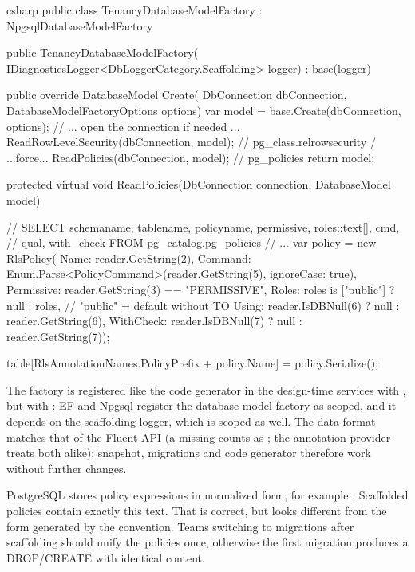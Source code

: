 \begin{sourcecode}{csharp}
public class TenancyDatabaseModelFactory : NpgsqlDatabaseModelFactory
{
    public TenancyDatabaseModelFactory(
        IDiagnosticsLogger<DbLoggerCategory.Scaffolding> logger)
        : base(logger)
    {
    }

    public override DatabaseModel Create(
        DbConnection dbConnection, DatabaseModelFactoryOptions options)
    {
        var model = base.Create(dbConnection, options);
        // ... open the connection if needed ...
        ReadRowLevelSecurity(dbConnection, model);    // pg_class.relrowsecurity / ...force...
        ReadPolicies(dbConnection, model);            // pg_policies
        return model;
    }

    protected virtual void ReadPolicies(DbConnection connection, DatabaseModel model)
    {
        // SELECT schemaname, tablename, policyname, permissive, roles::text[], cmd,
        //        qual, with_check FROM pg_catalog.pg_policies
        // ...
        var policy = new RlsPolicy(
            Name: reader.GetString(2),
            Command: Enum.Parse<PolicyCommand>(reader.GetString(5), ignoreCase: true),
            Permissive: reader.GetString(3) == "PERMISSIVE",
            Roles: roles is ["public"] ? null : roles,    // "public" = default without TO
            Using: reader.IsDBNull(6) ? null : reader.GetString(6),
            WithCheck: reader.IsDBNull(7) ? null : reader.GetString(7));

        table[RlsAnnotationNames.PolicyPrefix + policy.Name] = policy.Serialize();
    }
}
\end{sourcecode}

The factory is registered like the code generator in the design-time services with
, but with : EF and Npgsql
register the database model factory as scoped, and it depends on the scaffolding logger,
which is scoped as well. The data format matches that of the Fluent API (a missing  counts as
; the annotation provider treats both alike); snapshot, migrations and code generator therefore work without
further changes.

\begin{note}
  PostgreSQL stores policy expressions in normalized form, for example
  . Scaffolded policies contain exactly this text.
  That is correct, but looks different from the form generated by the convention. Teams
  switching to migrations after scaffolding should unify the policies once, otherwise the
  first migration produces a DROP/CREATE with identical content.
\end{note}


